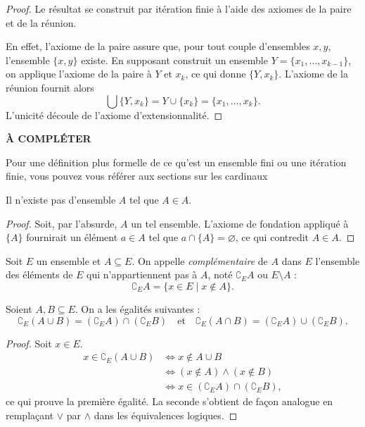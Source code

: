 \begin{proof}
	Le résultat se construit par itération finie à l’aide des axiomes de la paire et de la réunion.  
	
	En effet, l’axiome de la paire assure que, pour tout couple d’ensembles $x, y$, l’ensemble $\{x, y\}$ existe.  
	En supposant construit un ensemble $Y = \{x_1, \dotsc, x_{k-1}\}$, on applique l’axiome de la paire à $Y$ et $x_k$, ce qui donne $\{Y, x_k\}$.  
	L’axiome de la réunion fournit alors
	\[
		\bigcup \{Y, x_k\} = Y \cup \{x_k\} = \{x_1, \dotsc, x_k\}.
	\]
	L’unicité découle de l’axiome d’extensionnalité.
\end{proof}
\textbf{À COMPLÉTER}
\begin{remarque}
    Pour une définition plus formelle de ce qu'est un ensemble fini ou une itération finie, vous pouvez vous référer aux sections sur les cardinaux 
\end{remarque}
\begin{proposition}
	Il n’existe pas d’ensemble $A$ tel que $A \in A$.
\end{proposition}
\begin{proof}
	Soit, par l'absurde, $A$ un tel ensemble. L’axiome de fondation appliqué à $\{A\}$ fournirait un élément $a\in A$ tel que $a\cap \{A\} = \varnothing$, ce qui contredit $A\in A$.
\end{proof}

\begin{definition}[Complémentaire]
	Soit $E$ un ensemble et $A\subseteq E$.  
	On appelle \emph{complémentaire} de $A$ dans $E$ l’ensemble des éléments de $E$ qui n’appartiennent pas à $A$, noté $\complement_E A$ ou $E\setminus A$ :
	\[
	\complement_E A = \{x\in E \mid x\notin A\}.
	\]
\end{definition}

\begin{proposition}
	Soient $A,B\subseteq E$. On a les égalités suivantes :
	\[
	\complement_E (A\cup B) = (\complement_E A)\cap(\complement_E B)
	\quad\text{et}\quad
	\complement_E (A\cap B) = (\complement_E A)\cup(\complement_E B).
	\]
\end{proposition}

\begin{proof}
	Soit $x\in E$.  
	\begin{align*}
		x\in \complement_E (A\cup B)
		&\Leftrightarrow x\notin A\cup B \\
		&\Leftrightarrow (x\notin A)\land(x\notin B) \\
		&\Leftrightarrow x\in (\complement_E A)\cap(\complement_E B),
	\end{align*}
	ce qui prouve la première égalité.  
	La seconde s’obtient de façon analogue en remplaçant $\lor$ par $\land$ dans les équivalences logiques.
\end{proof}

